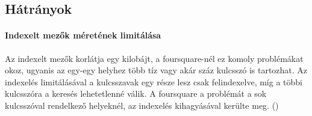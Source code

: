 \subsection{Hátrányok} 

	\paragraph{Indexelt mezők méretének limitálása}
		Az indexelt mezők korlátja egy kilobájt, a foursquare-nél ez komoly problémákat okoz, ugyanis az egy-egy helyhez több tíz vagy akár száz kulcsszó is tartozhat. Az indexelés limitálásával a kulcsszavak egy része lesz csak felindexelve, míg a többi kulcsszóra a keresés lehetetlenné válik. A foursquare a problémát a sok kulcsszóval rendelkező helyeknél, az indexelés kihagyásával kerülte meg. ()

